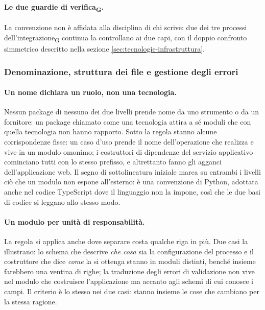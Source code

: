 \documentclass[a4paper, 10pt]{article}
\begin{document}
\paragraph{Le due guardie di verifica\textsubscript{G}.}
La convenzione non è affidata alla disciplina di chi scrive: due dei tre processi dell'integrazione\textsubscript{G} continua la controllano ai due capi, con il doppio confronto simmetrico descritto nella sezione \ref{sec:tecnologie-infrastruttura}.

\subsubsection{Denominazione, struttura dei file e gestione degli errori}
\label{sec:idiomi-denominazione}

\paragraph{Un nome dichiara un ruolo, non una tecnologia.}
Nessun package di nessuno dei due livelli prende nome da uno strumento o da un fornitore: un package chiamato come una tecnologia attira a sé moduli che con quella tecnologia non hanno rapporto. Sotto la regola stanno alcune corrispondenze fisse: un caso d'uso prende il nome dell'operazione che realizza e vive in un modulo omonimo; i costruttori di dipendenze del servizio applicativo cominciano tutti con lo stesso prefisso, e altrettanto fanno gli agganci dell'applicazione web. Il segno di sottolineatura iniziale marca su entrambi i livelli ciò che un modulo non espone all'esterno: è una convenzione di Python, adottata anche nel codice TypeScript dove il linguaggio non la impone, così che le due basi di codice si leggano allo stesso modo.

\paragraph{Un modulo per unità di responsabilità.}
La regola si applica anche dove separare costa qualche riga in più. Due casi la illustrano: lo schema che descrive \textit{che cosa} sia la configurazione del processo e il costruttore che dice \textit{come} la si ottenga stanno in moduli distinti, benché insieme farebbero una ventina di righe; la traduzione degli errori di validazione non vive nel modulo che costruisce l'applicazione ma accanto agli schemi di cui conosce i campi. Il criterio è lo stesso nei due casi: stanno insieme le cose che cambiano per la stessa ragione.
\end{document}
